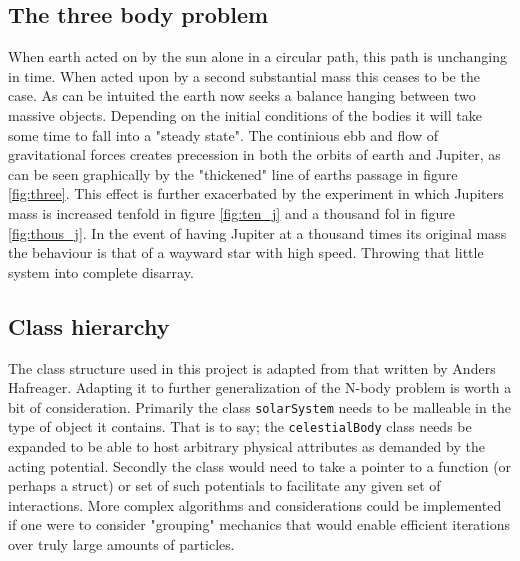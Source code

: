 \subsection{The three body problem}
When earth acted on by the sun alone in a circular path, this path is unchanging in time. When acted upon by a second substantial mass this ceases to be the case. As can be intuited the earth now seeks a balance hanging between two massive objects. Depending on the initial conditions of the bodies it will take some time to fall into a "steady state". The continious ebb and flow of gravitational forces creates precession in both the orbits of earth and Jupiter, as can be seen graphically by the "thickened" line of earths passage in figure \ref{fig:three}. This effect is further exacerbated by  the experiment in which Jupiters mass is increased tenfold in figure \ref{fig:ten_j} and a thousand fol in figure \ref{fig:thous_j}.
In the event of having Jupiter at a thousand times its original mass the behaviour is that of a wayward star with high speed. Throwing that little system into complete disarray.   

\subsection{Class hierarchy}

The class structure used in this project is adapted from that written by Anders Hafreager. Adapting it to further generalization of the N-body problem is worth a bit of consideration. Primarily the class \lstinline{solarSystem} needs to be malleable  in the type of object it contains. That is to say; the \lstinline{celestialBody} class needs be expanded to be able to host arbitrary physical attributes as demanded by the acting potential. Secondly the class would need to take a pointer to a function (or perhaps a struct) or set of such potentials to facilitate any given set of interactions. More complex algorithms and considerations could be implemented if one were to consider "grouping" mechanics that would enable efficient iterations over truly large amounts of particles.